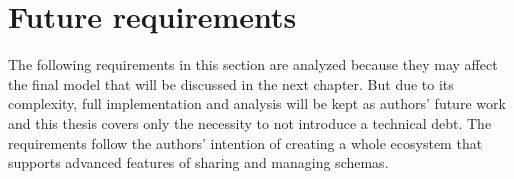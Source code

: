 





\section{Future requirements}

The following requirements in this section are analyzed because they may affect the final model that will be discussed in the next chapter. But due to its complexity, full implementation and analysis will be kept as authors' future work and this thesis covers only the necessity to not introduce a technical debt. The requirements follow the authors' intention of creating a whole ecosystem that supports advanced features of sharing and managing schemas.









